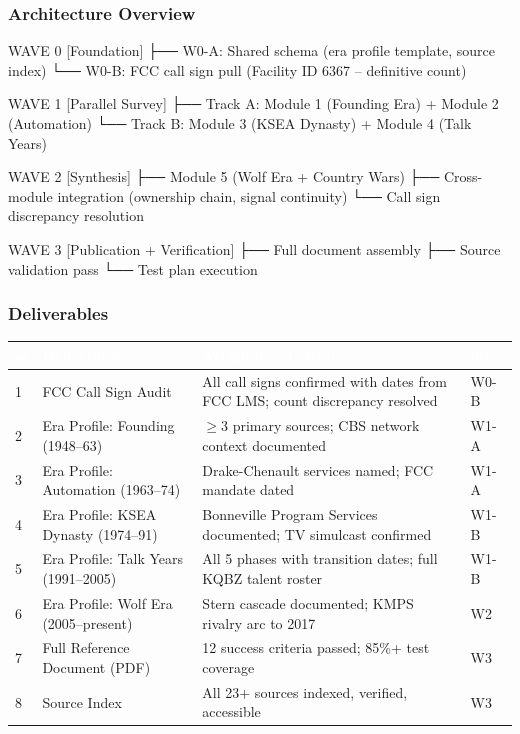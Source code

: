 \documentclass[11pt,letterpaper]{article}
\newcommand{\tableheader}[1]{\textbf{\sffamily\textcolor{white}{#1}}}
\begin{document}
\subsubsection{Architecture Overview}

\begin{asciibox}
WAVE 0    [Foundation]
  ├── W0-A: Shared schema (era profile template, source index)
  └── W0-B: FCC call sign pull (Facility ID 6367 -- definitive count)

WAVE 1    [Parallel Survey]
  ├── Track A: Module 1 (Founding Era) + Module 2 (Automation)
  └── Track B: Module 3 (KSEA Dynasty) + Module 4 (Talk Years)

WAVE 2    [Synthesis]
  ├── Module 5 (Wolf Era + Country Wars)
  ├── Cross-module integration (ownership chain, signal continuity)
  └── Call sign discrepancy resolution

WAVE 3    [Publication + Verification]
  ├── Full document assembly
  ├── Source validation pass
  └── Test plan execution
\end{asciibox}

\subsubsection{Deliverables}

\begin{center}
\begin{tabularx}{\textwidth}{C{0.5cm}L{4cm}XC{1.5cm}}
\toprule
{}
\tableheader{\#} & \tableheader{Deliverable} & \tableheader{Acceptance Criteria} & \tableheader{Spec} \\
 & FCC Call Sign Audit & All call signs confirmed with dates from FCC LMS; count discrepancy resolved & W0-B \\
2 & Era Profile: Founding (1948--63) & $\geq$3 primary sources; CBS network context documented & W1-A \\
3 & Era Profile: Automation (1963--74) & Drake-Chenault services named; FCC mandate dated & W1-A \\
4 & Era Profile: KSEA Dynasty (1974--91) & Bonneville Program Services documented; TV simulcast confirmed & W1-B \\
5 & Era Profile: Talk Years (1991--2005) & All 5 phases with transition dates; full KQBZ talent roster & W1-B \\
6 & Era Profile: Wolf Era (2005--present) & Stern cascade documented; KMPS rivalry arc to 2017 & W2 \\
7 & Full Reference Document (PDF) & 12 success criteria passed; 85\%+ test coverage & W3 \\
8 & Source Index & All 23+ sources indexed, verified, accessible & W3 \\
\bottomrule
\end{tabularx}
\end{center}
\end{document}
